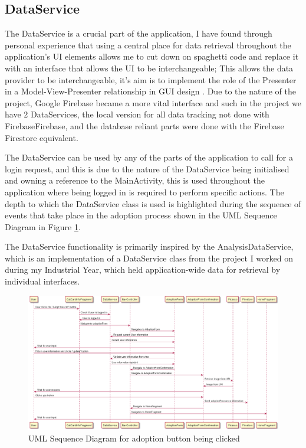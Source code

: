 \subsection{DataService}

The DataService is a crucial part of the application, I have found through personal experience that using a central place for data retrieval throughout the application's UI elements allows me to cut down on spaghetti code and replace it with an interface that allows the UI to be interchangeable; This allows the data provider to be interchangeable, it's aim is to implement the role of the Presenter in a Model-View-Presenter relationship in GUI design \cite{MODELVIEWPRESENTER}. Due to the nature of the project, Google Firebase became a more vital interface and such in the project we have 2 DataServices, the local version for all data tracking not done with FirebaseFirebase, and the database reliant parts were done with the Firebase Firestore equivalent.

The DataService can be used by any of the parts of the application to call for a login request, and this is due to the nature of the DataService being initialised and owning a reference to the MainActivity, this is used throughout the application where being logged in is required to perform specific actions. The depth to which the DataService class is used is highlighted during the sequence of events that take place in the adoption process shown in the UML Sequence Diagram in Figure \ref{fig:sequenceDiagram}.

The DataService functionality is primarily inspired by the AnalysisDataService, which is an implementation of a DataService \cite{MANTIDDATASERVICE} class from the project I worked on during my Industrial Year, which held application-wide data for retrieval by individual interfaces.

        \begin{figure} [htbp!]
            \centering
            \includegraphics[width=\textwidth]{Images/Sequence Diagram Adoption Button Click.png}
            \caption{UML Sequence Diagram for adoption button being clicked}
            \label{fig:sequenceDiagram}
        \end{figure}
